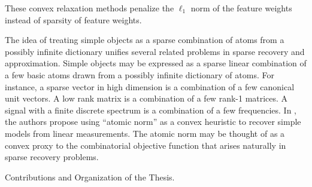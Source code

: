 These convex relaxation methods penalize the $\ell_1$ norm of the feature weights instead of sparsity of feature weights.


The idea of treating simple objects as a sparse combination of atoms from a
possibly infinite dictionary unifies several related problems in sparse
recovery and approximation. Simple objects may be expressed as a sparse linear
combination of a few basic atoms drawn from a possibly infinite dictionary of
atoms. For instance, a sparse vector in high dimension is a combination of a
few canonical unit vectors. A low rank matrix is a combination of a few rank-1
matrices. A signal with a finite discrete spectrum is a combination of a few
frequencies.  In \cite{crpw}, the authors propose using ``atomic norm'' as a
convex heuristic to recover simple models from linear measurements. The atomic
norm may be thought of as a convex proxy to the combinatorial objective
function that arises naturally in sparse recovery problems.


Contributions and Organization of the Thesis.
